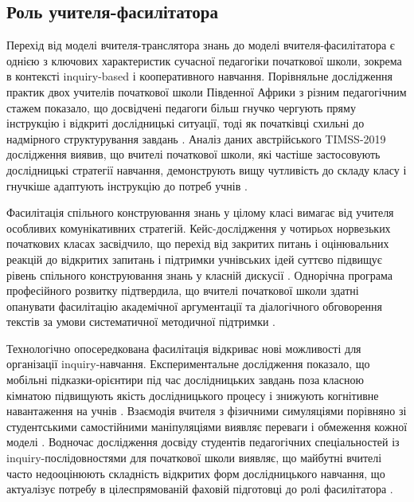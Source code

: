 \documentclass[a4paper,12pt]{article}
\begin{document}
\subsection{Роль учителя-фасилітатора}

Перехід від моделі вчителя-транслятора знань до моделі вчителя-фасилітатора є однією з ключових характеристик сучасної педагогіки початкової школи, зокрема в контексті inquiry-based і кооперативного навчання. Порівняльне дослідження практик двох учителів початкової школи Південної Африки з різним педагогічним стажем показало, що досвідчені педагоги більш гнучко чергують пряму інструкцію і відкриті дослідницькі ситуації, тоді як початківці схильні до надмірного структурування завдань \parencite{Photo20251493}. Аналіз даних австрійського TIMSS-2019 дослідження виявив, що вчителі початкової школи, які частіше застосовують дослідницькі стратегії навчання, демонструють вищу чутливість до складу класу і гнучкіше адаптують інструкцію до потреб учнів \parencite{Neubauer-Hametner2025}.

Фасилітація спільного конструювання знань у цілому класі вимагає від учителя особливих комунікативних стратегій. Кейс-дослідження у чотирьох норвезьких початкових класах засвідчило, що перехід від закритих питань і оцінювальних реакцій до відкритих запитань і підтримки учнівських ідей суттєво підвищує рівень спільного конструювання знань у класній дискусії \parencite{Hogsnes20241}. Однорічна програма професійного розвитку підтвердила, що вчителі початкової школи здатні опанувати фасилітацію академічної аргументації та діалогічного обговорення текстів за умови систематичної методичної підтримки \parencite{Reznitskaya2019254}.

Технологічно опосередкована фасилітація відкриває нові можливості для організації inquiry-навчання. Експериментальне дослідження показало, що мобільні підказки-орієнтири під час дослідницьких завдань поза класною кімнатою підвищують якість дослідницького процесу і знижують когнітивне навантаження на учнів \parencite{Martin20245}. Взаємодія вчителя з фізичними симуляціями порівняно зі студентськими самостійними маніпуляціями виявляє переваги і обмеження кожної моделі \parencite{Magkouta2024253}. Водночас дослідження досвіду студентів педагогічних спеціальностей із inquiry-послідовностями для початкової школи виявляє, що майбутні вчителі часто недооцінюють складність відкритих форм дослідницького навчання, що актуалізує потребу в цілеспрямованій фаховій підготовці до ролі фасилітатора \parencite{Haslekås2022}.
\end{document}
